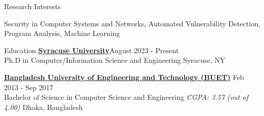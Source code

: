 \documentclass[12pt]{resume} %
\begin{document}
\begin{rSection}{Research Interests}

Security in Computer Systems and Networks, Automated Vulnerability Detection, Program Analysis, Machine Learning
\end{rSection}

\begin{rSection}{Education}
{\bf \href{https://ecs.syracuse.edu/}{Syracuse University}}\hfill {August 2023 - Present} \\
Ph.D in Computer/Information Science and Engineering \hfill {Syracuse, NY}

{\bf \href{https://cse.buet.ac.bd/}{Bangladesh University of Engineering and Technology (BUET)}} \hfill {Feb 2013 - Sep 2017}\\
Bachelor of Science in Computer Science and Engineering  {\it CGPA: 3.57 (out of 4.00)} \hfill Dhaka, Bangladesh
\end{rSection}

\end{document}
